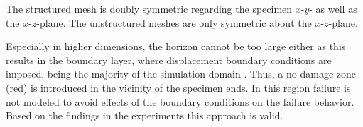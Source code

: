 The structured mesh is doubly symmetric regarding the specimen $x$-$y$- as well as the $x$-$z$-plane. The unstructured meshes are only symmetric about the $x$-$z$-plane.

Especially in higher dimensions, the horizon cannot be too large either as this results in the boundary layer, where displacement boundary conditions are imposed, being the majority of the simulation domain \cite{SelesonP2016b}. Thus, a no-damage zone (red) is introduced in the vicinity of the specimen ends. In this region failure is not modeled to avoid effects of the boundary conditions on the failure behavior. Based on the findings in the experiments this approach is valid.


